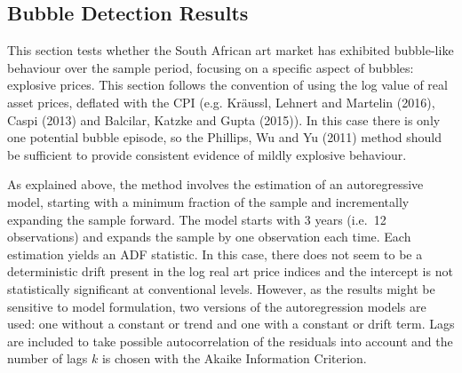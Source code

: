 \documentclass[12pt,]{article}
\begin{document}
\subsection{Bubble Detection Results}\label{bubble-detection-results}

This section tests whether the South African art market has exhibited
bubble-like behaviour over the sample period, focusing on a specific
aspect of bubbles: explosive prices. This section follows the convention
of using the log value of real asset prices, deflated with the CPI (e.g.
Kräussl, Lehnert and Martelin (2016), Caspi (2013) and Balcilar, Katzke
and Gupta (2015)). In this case there is only one potential bubble
episode, so the Phillips, Wu and Yu (2011) method should be sufficient
to provide consistent evidence of mildly explosive behaviour.

As explained above, the method involves the estimation of an
autoregressive model, starting with a minimum fraction of the sample and
incrementally expanding the sample forward. The model starts with 3
years (i.e.~12 observations) and expands the sample by one observation
each time. Each estimation yields an ADF statistic. In this case, there
does not seem to be a deterministic drift present in the log real art
price indices and the intercept is not statistically significant at
conventional levels. However, as the results might be sensitive to model
formulation, two versions of the autoregression models are used: one
without a constant or trend and one with a constant or drift term. Lags
are included to take possible autocorrelation of the residuals into
account and the number of lags \(k\) is chosen with the Akaike
Information Criterion.
\end{document}
